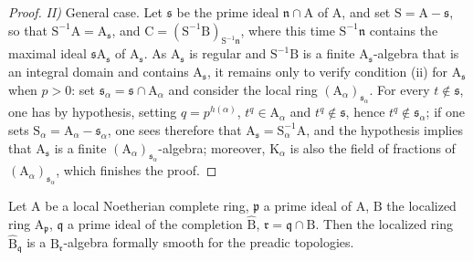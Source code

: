 \begin{proof}
\emph{II)} General case.
Let $\mathfrak{s}$ be the prime ideal $\mathfrak{n}\cap\mathrm{A}$ of $\mathrm{A}$, and set $\mathrm{S}=\mathrm{A}-\mathfrak{s}$, so that $\mathrm{S}^{-1}\mathrm{A}=\mathrm{A}_\mathfrak{s}$, and $\mathrm{C}=(\mathrm{S}^{-1}\mathrm{B})_{\mathrm{S}^{-1}\mathfrak{n}}$, where this time $\mathrm{S}^{-1}\mathfrak{n}$ contains the maximal ideal $\mathfrak{s}\mathrm{A}_\mathfrak{s}$ of $\mathrm{A}_\mathfrak{s}$.
As $\mathrm{A}_\mathfrak{s}$ is regular  and $\mathrm{S}^{-1}\mathrm{B}$ is a finite $\mathrm{A}_\mathfrak{s}$-algebra that is an integral domain and contains $\mathrm{A}_\mathfrak{s}$, it remains only to verify condition (ii) for $\mathrm{A}_\mathfrak{s}$ when $p>0$: set $\mathfrak{s}_\alpha=\mathfrak{s}\cap\mathrm{A}_\alpha$ and consider the local ring $(\mathrm{A}_\alpha)_{\mathfrak{s}_\alpha}$.
For every $t\notin\mathfrak{s}$, one has by hypothesis, setting $q=p^{h(\alpha)}$, $t^q\in\mathrm{A}_\alpha$ and $t^q\notin\mathfrak{s}$, hence $t^q\notin\mathfrak{s}_\alpha$; if one sets $\mathrm{S}_\alpha=\mathrm{A}_\alpha-\mathfrak{s}_\alpha$, one sees therefore that $\mathrm{A}_\mathfrak{s}=\mathrm{S}_\alpha^{-1}\mathrm{A}$, and the hypothesis implies that $\mathrm{A}_\mathfrak{s}$ is a finite $(\mathrm{A}_\alpha)_{\mathfrak{s}_\alpha}$-algebra; moreover, $\mathrm{K}_\alpha$ is also the field of fractions of $(\mathrm{A}_\alpha)_{\mathfrak{s}_\alpha}$, which finishes the proof.
\end{proof}

\begin{theorem}[22.3.3]
\label{0.22.3.3}
Let $\mathrm{A}$ be a local Noetherian complete ring, $\mathfrak{p}$ a prime ideal of $\mathrm{A}$, $\mathrm{B}$ the localized ring $\mathrm{A}_\mathfrak{p}$, $\mathfrak{q}$ a prime ideal of the completion $\widehat{\mathrm{B}}$, $\mathfrak{r}=\mathfrak{q}\cap\mathrm{B}$.
Then the localized ring $\widehat{\mathrm{B}}_\mathfrak{q}$ is a $\mathrm{B}_\mathfrak{r}$-algebra formally smooth for the preadic topologies.
\end{theorem}

